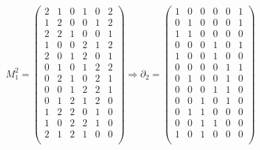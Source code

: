 $M^{2}_{1} =
\begin{pmatrix}
2 & 1 & 0 & 1 & 0 & 2\\
1 & 2 & 0 & 0 & 1 & 2\\
2 & 2 & 1 & 0 & 0 & 1\\
1 & 0 & 0 & 2 & 1 & 2\\
2 & 0 & 1 & 2 & 0 & 1\\
0 & 1 & 0 & 1 & 2 & 2\\
0 & 2 & 1 & 0 & 2 & 1\\
0 & 0 & 1 & 2 & 2 & 1\\
0 & 1 & 2 & 1 & 2 & 0\\
1 & 2 & 2 & 0 & 1 & 0\\
1 & 0 & 2 & 2 & 1 & 0\\
2 & 1 & 2 & 1 & 0 & 0\\
\end{pmatrix}
\Rightarrow \partial_{2} = 
\begin{pmatrix}
1 & 0 & 0 & 0 & 0 & 1\\
0 & 1 & 0 & 0 & 0 & 1\\
1 & 1 & 0 & 0 & 0 & 0\\
0 & 0 & 0 & 1 & 0 & 1\\
1 & 0 & 0 & 1 & 0 & 0\\
0 & 0 & 0 & 0 & 1 & 1\\
0 & 1 & 0 & 0 & 1 & 0\\
0 & 0 & 0 & 1 & 1 & 0\\
0 & 0 & 1 & 0 & 1 & 0\\
0 & 1 & 1 & 0 & 0 & 0\\
0 & 0 & 1 & 1 & 0 & 0\\
1 & 0 & 1 & 0 & 0 & 0\\
\end{pmatrix}$